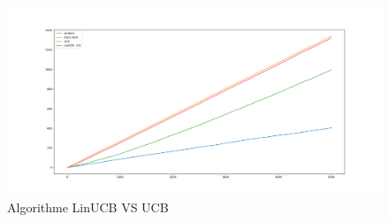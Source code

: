 \documentclass[french]{article}
\begin{document}
\begin{figure}[H]
	\centering
	\includegraphics[scale=0.3]{img/linucb_ucb.png}
	\caption{Algorithme LinUCB VS UCB}
\end{figure}


	
	
\end{document}
